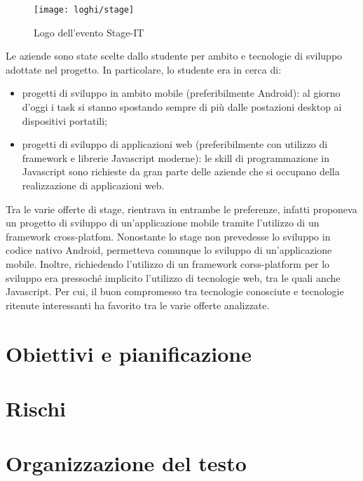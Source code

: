 \begin{figure}[!h] 
    \centering 
    \texttt{[image: loghi/stage]} 
    \caption{Logo dell'evento Stage-IT}
\end{figure}

Le aziende sono state scelte dallo studente per ambito e tecnologie di sviluppo adottate nel progetto. In particolare, lo studente era in cerca di:
\begin{itemize}
	\item progetti di sviluppo in ambito mobile (preferibilmente Android): al giorno d'oggi i task si stanno spostando sempre di più dalle postazioni desktop ai dispositivi portatili;
	\item progetti di sviluppo di applicazioni web (preferibilmente con utilizzo di framework e librerie Javascript moderne): le skill di programmazione in Javascript sono richieste da gran parte delle aziende che si occupano della realizzazione di applicazioni web.
\end{itemize}
Tra le varie offerte di stage, \visione{} rientrava in entrambe le preferenze, infatti proponeva un progetto di sviluppo di un'applicazione mobile tramite l'utilizzo di un framework cross-platfom. Nonostante lo stage non prevedesse lo sviluppo in codice nativo Android, permetteva comunque lo sviluppo di un'applicazione mobile. Inoltre, richiedendo l'utilizzo di un framework corss-platform per lo sviluppo era pressoché implicito l'utilizzo di tecnologie web, tra le quali anche Javascript. Per cui, il buon compromesso tra tecnologie conosciute e tecnologie ritenute interessanti ha favorito \visione{} tra le varie offerte analizzate.

\section{Obiettivi e pianificazione}

\section{Rischi}

\section{Organizzazione del testo}

